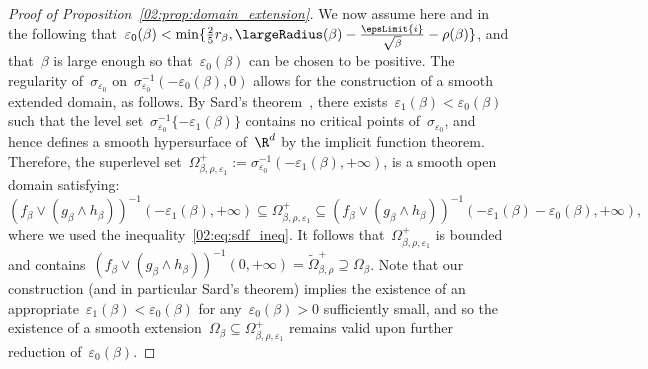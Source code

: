 \begin{proof}[Proof of Proposition~\ref{02:prop:domain_extension}]
        We now assume here and in the following that~$\varepsilon_0(\beta) < \min\{\frac{2}{5}r_\beta,\largeRadius(\beta)-\frac{\epsLimit{i}}{\sqrt\beta}-\rho(\beta)\}$, and that~$\beta$ is large enough so that~$\varepsilon_0(\beta)$ can be chosen to be positive.
        The regularity of~$\sigma_{\varepsilon_0}$ on~$\sigma_{\varepsilon_0}^{-1}(-\varepsilon_0(\beta),0)$ allows for the construction of a smooth extended domain, as follows. By Sard's theorem~\cite{S42}, there exists~$\varepsilon_1(\beta) < \varepsilon_0(\beta)$ such that the level set~$\sigma_{\varepsilon_0}^{-1}\{-\varepsilon_1(\beta)\}$ contains no critical points of~$\sigma_{\varepsilon_0}$, and hence defines a smooth hypersurface of~$\R^d$ by the implicit function theorem.
        Therefore, the superlevel set~${\Omega_{\beta,\rho,\varepsilon_1}^{+} := \sigma_{\varepsilon_0}^{-1}(-\varepsilon_1(\beta),+\infty)}$, is a smooth open domain satisfying:
        \[(f_\beta \lor (g_\beta\land h_\beta))^{-1}(-\varepsilon_1(\beta),+\infty) \subseteq \Omega_{\beta,\rho,\varepsilon_1}^{+}\subseteq(f_\beta \lor (g_\beta\land h_\beta))^{-1}(-\varepsilon_1(\beta)-\varepsilon_0(\beta),+\infty),\]
        where we used the inequality~\eqref{02:eq:sdf_ineq}. It follows that~$\Omega_{\beta,\rho,\varepsilon_1}^+$ is bounded and contains~$(f_\beta \lor (g_\beta\land h_\beta))^{-1}(0,+\infty)=\widetilde{\Omega}_{\beta,\rho}^+\supseteq \Omega_\beta  $. Note that our construction (and in particular Sard's theorem) implies the existence of an appropriate~$\varepsilon_1(\beta)<\varepsilon_0(\beta)$ for any~$\varepsilon_0(\beta)>0$ sufficiently small, and so the existence of a smooth extension~$\Omega_\beta\subseteq\Omega_{\beta,\rho,\varepsilon_1}^+$ remains valid upon further reduction of~$\varepsilon_0(\beta)$.


\end{proof}
